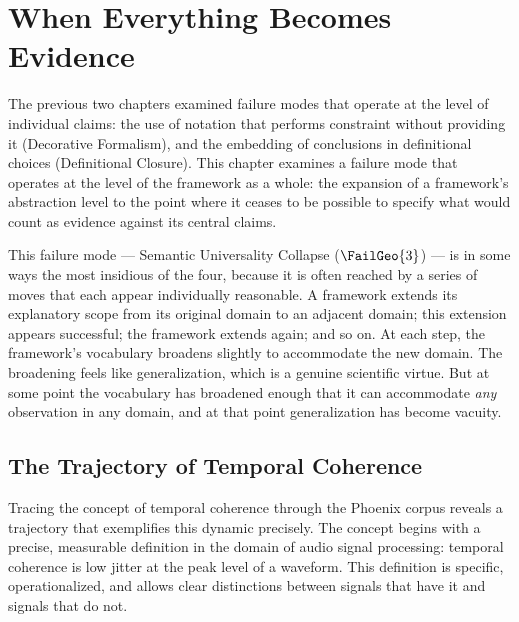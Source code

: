 
\chapter{When Everything Becomes Evidence}
\label{ch:semantic-universality}


\noindent
The previous two chapters examined failure modes that operate
at the level of individual claims: the use of notation that
performs constraint without providing it (Decorative Formalism),
and the embedding of conclusions in definitional choices
(Definitional Closure). This chapter examines a failure mode
that operates at the level of the framework as a whole:
the expansion of a framework's abstraction level to the point
where it ceases to be possible to specify what would count
as evidence against its central claims.

This failure mode --- Semantic Universality Collapse
($\FailGeo{3}$) --- is in some ways the most insidious of
the four, because it is often reached by a series of moves
that each appear individually reasonable. A framework
extends its explanatory scope from its original domain
to an adjacent domain; this extension appears successful;
the framework extends again; and so on. At each step,
the framework's vocabulary broadens slightly to accommodate
the new domain. The broadening feels like generalization,
which is a genuine scientific virtue. But at some point
the vocabulary has broadened enough that it can accommodate
\textit{any} observation in any domain, and at that point
generalization has become vacuity.

\section{The Trajectory of Temporal Coherence}
\label{sec:coherence-trajectory}

Tracing the concept of temporal coherence through the Phoenix
corpus reveals a trajectory that exemplifies this dynamic
precisely. The concept begins with a precise, measurable
definition in the domain of audio signal processing: temporal
coherence is low jitter at the peak level of a waveform.
This definition is specific, operationalized, and allows
clear distinctions between signals that have it and signals
that do not.

